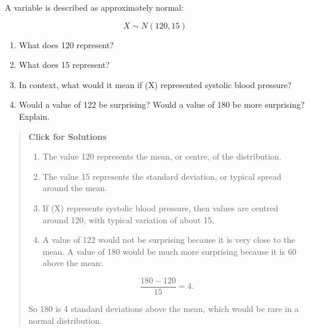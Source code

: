 \documentclass[
  letterpaper,
  DIV=11,
  numbers=noendperiod]{scrreprt}
\begin{document}
\begin{tcolorbox}[enhanced jigsaw, arc=.35mm, bottomrule=.15mm, bottomtitle=1mm, breakable, colback=white, colbacktitle=quarto-callout-note-color!10!white, colframe=quarto-callout-note-color-frame, coltitle=black, left=2mm, leftrule=.75mm, opacityback=0, opacitybacktitle=0.6, rightrule=.15mm, title=\textcolor{quarto-callout-note-color}{\faInfo}\hspace{0.5em}{Question 11}, titlerule=0mm, toprule=.15mm, toptitle=1mm]

A variable is described as approximately normal:

\[
X \sim N(120, 15)
\]

\begin{enumerate}
\def\labelenumi{\alph{enumi}.}
\item
  What does 120 represent?
\item
  What does 15 represent?
\item
  In context, what would it mean if (X) represented systolic blood
  pressure?
\item
  Would a value of 122 be surprising? Would a value of 180 be more
  surprising? Explain.
\end{enumerate}

\begin{quote}
\textbf{Click for Solutions}

\begin{enumerate}
\def\labelenumi{\alph{enumi}.}
\item
  The value 120 represents the mean, or centre, of the distribution.
\item
  The value 15 represents the standard deviation, or typical spread
  around the mean.
\item
  If (X) represents systolic blood pressure, then values are centred
  around 120, with typical variation of about 15.
\item
  A value of 122 would not be surprising because it is very close to the
  mean. A value of 180 would be much more surprising because it is 60
  above the mean:
\end{enumerate}

\[
\frac{180 - 120}{15} = 4.
\]

So 180 is 4 standard deviations above the mean, which would be rare in a
normal distribution.
\end{quote}

\end{tcolorbox}
\end{document}
